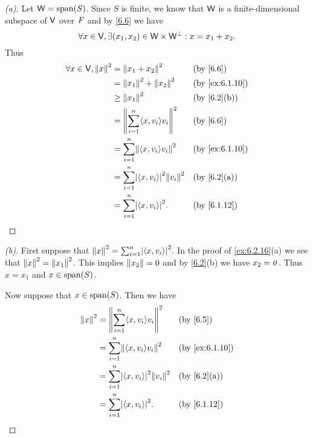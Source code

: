 \begin{proof}[(a)]
  Let \(\W = \spn{S}\).
  Since \(S\) is finite, we know that \(\mathsf{W}\) is a finite-dimensional subspace of \(\mathsf{V}\) over \(\mathit{F}\) and by \cref{6.6} we have
  \[
    \forall x \in \mathsf{V}, \exists (x_1, x_2) \in \mathsf{W} \times \mathsf{W}^{\perp} : x = x_1 + x_2.
  \]
  Thus
  \begin{align*}
    \forall x \in \V, \norm{x}^2 & = \norm{x_1 + x_2}^2                               &  & \by{6.6}       \\
                                 & = \norm{x_1}^2 + \norm{x_2}^2                      &  & \by{ex:6.1.10} \\
                                 & \geq \norm{x_1}^2                                  &  & \by{6.2}[b]    \\
                                 & = \norm{\sum_{i = 1}^n \inn{x, v_i} v_i}^2         &  & \by{6.6}       \\
                                 & = \sum_{i = 1}^n \norm{\inn{x, v_i} v_i}^2         &  & \by{ex:6.1.10} \\
                                 & = \sum_{i = 1}^n \abs{\inn{x, v_i}}^2 \norm{v_i}^2 &  & \by{6.2}[a]    \\
                                 & = \sum_{i = 1}^n \abs{\inn{x, v_i}}^2.             &  & \by{6.1.12}
  \end{align*}
\end{proof}

\begin{proof}[(b)]
  First suppose that \(\norm{x}^2 = \sum_{i = 1}^n \abs{\inn{x, v_i}}^2\).
  In the proof of \cref{ex:6.2.16}(a) we see that \(\left\lVert x\right\rVert^2 = \left\lVert x_1\right\rVert^2\).
  This implies \(\left\lVert x_2\right\rVert = 0\) and by \cref{6.2}(b) we have \(x_2 = \mathit{0}\).
  Thus \(x = x_1\) and \(x \in \spn{S}\).

  Now suppose that \(x \in \spn{S}\).
  Then we have
  \begin{align*}
    \norm{x}^2 & = \norm{\sum_{i = 1}^n \inn{x, v_i} v_i}^2         &  & \by{6.5}       \\
               & = \sum_{i = 1}^n \norm{\inn{x, v_i} v_i}^2         &  & \by{ex:6.1.10} \\
               & = \sum_{i = 1}^n \abs{\inn{x, v_i}}^2 \norm{v_i}^2 &  & \by{6.2}[a]    \\
               & = \sum_{i = 1}^n \abs{\inn{x, v_i}}^2.             &  & \by{6.1.12}
  \end{align*}
\end{proof}

